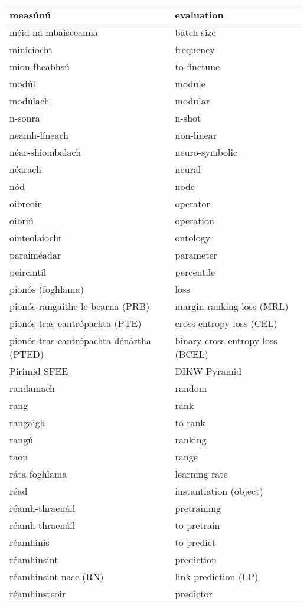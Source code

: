 \begin{longtable}{|l|l|}
		measúnú&evaluation\\ \hline 
		méid na mbaisceanna&batch size\\ \hline 
		minicíocht&frequency\\ \hline 
		mion-fheabhsú&to finetune\\ \hline 
		modúl&module\\ \hline 
		modúlach&modular\\ \hline 
		n-sonra&n-shot\\ \hline 
		neamh-líneach&non-linear\\ \hline 
		néar-shiombalach&neuro-symbolic\\ \hline 
		néarach&neural\\ \hline 
		nód&node\\ \hline 
		oibreoir&operator\\ \hline 
		oibriú&operation\\ \hline 
		ointeolaíocht&ontology\\ \hline 
		paraiméadar&parameter\\ \hline 
		peircintíl&percentile\\ \hline 
		pionós (foghlama)&loss\\ \hline 
		pionós rangaithe le bearna (PRB)&margin ranking loss (MRL)\\ \hline 
		pionós tras-eantrópachta (PTE)&cross entropy loss (CEL)\\ \hline 
		pionós tras-eantrópachta dénártha (PTED)&binary cross entropy loss (BCEL)\\ \hline 
		Pirimid SFEE&DIKW Pyramid\\ \hline 
		randamach&random\\ \hline 
		rang&rank\\ \hline 
		rangaigh&to rank\\ \hline 
		rangú&ranking\\ \hline 
		raon&range\\ \hline 
		ráta foghlama&learning rate\\ \hline 
		réad&instantiation (object)\\ \hline 
		réamh-thraenáil&pretraining\\ \hline 
		réamh-thraenáil&to pretrain\\ \hline 
		réamhinis&to predict\\ \hline 
		réamhinsint&prediction\\ \hline 
		réamhinsint nasc (RN)&link prediction (LP)\\ \hline 
		réamhinsteoir&predictor\\ \hline 

\end{longtable}
